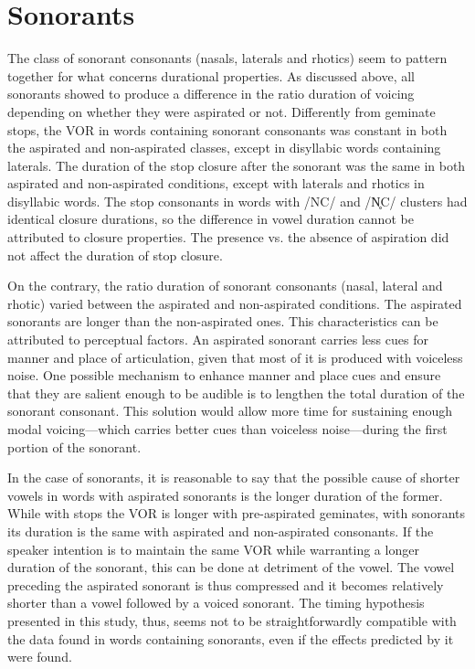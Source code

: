 \documentclass[11pt,a4paper,openany]{memoir}\usepackage[]{graphicx}\usepackage[]{color}
\begin{document}
\section{Sonorants}
The class of sonorant consonants (nasals, laterals and rhotics) seem to pattern together for what concerns durational properties.
As discussed above, all sonorants showed to produce a difference in the ratio duration of voicing depending on whether they were aspirated or not.
Differently from geminate stops, the VOR in words containing sonorant consonants was constant in both the aspirated and non-aspirated classes, except in disyllabic words containing laterals.
The duration of the stop closure after the sonorant was the same in both aspirated and non-aspirated conditions, except with laterals and rhotics in disyllabic words.
The stop consonants in words with /NC/ and /N̥C/ clusters had identical closure durations, so the difference in vowel duration cannot be attributed to closure properties.
The presence vs. the absence of aspiration did not affect the duration of stop closure.

On the contrary, the ratio duration of sonorant consonants (nasal, lateral and rhotic) varied between the aspirated and non-aspirated conditions.
The aspirated sonorants are longer than the non-aspirated ones.
This characteristics can be attributed to perceptual factors.
An aspirated sonorant carries less cues for manner and place of articulation, given that most of it is produced with voiceless noise.
One possible mechanism to enhance manner and place cues and ensure that they are salient enough to be audible is to lengthen the total duration of the sonorant consonant.
This solution would allow more time for sustaining enough modal voicing---which carries better cues than voiceless noise---during the first portion of the sonorant.

In the case of sonorants, it is reasonable to say that the possible cause of shorter vowels in words with aspirated sonorants is the longer duration of the former.
While with stops the VOR is longer with pre-aspirated geminates, with sonorants its duration is the same with aspirated and non-aspirated consonants.
If the speaker intention is to maintain the same VOR while warranting a longer duration of the sonorant, this can be done at detriment of the vowel.
The vowel preceding the aspirated sonorant is thus compressed and it becomes relatively shorter than a vowel followed by a voiced sonorant.
The timing hypothesis presented in this study, thus, seems not to be straightforwardly compatible with the data found in words containing sonorants, even if the effects predicted by it were found.
\end{document}
